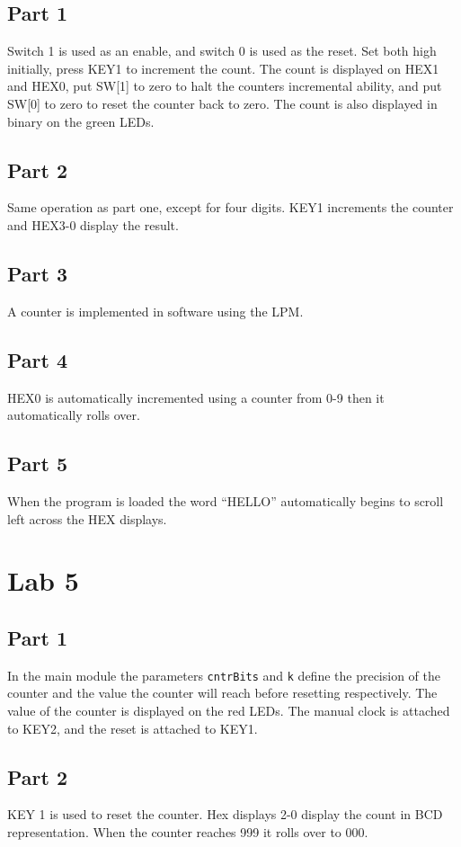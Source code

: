 \documentclass[oneside,letterpaper,12pt,titlepage]{article}
\begin{document}
\subsection{Part 1}
Switch 1 is used as an enable, and switch 0 is used as the reset. Set both high initially, press KEY1 to increment the count. The count is displayed on HEX1 and HEX0, put SW[1] to zero to halt the counters incremental ability, and put SW[0] to zero to reset the counter back to zero. The count is also displayed in binary on the green LEDs.

\subsection{Part 2}
Same operation as part one, except for four digits. KEY1 increments the counter and HEX3-0 display the result. 

\subsection{Part 3}
A counter is implemented in software using the LPM.

\subsection{Part 4}
HEX0 is automatically incremented using a counter from 0-9 then it automatically rolls over.

\subsection{Part 5}
When the program is loaded the word ``HELLO'' automatically begins to scroll left across the HEX displays.

\section{Lab 5}

\subsection{Part 1}
In the main module the parameters \texttt{cntrBits} and \texttt{k} define the precision of the counter and the value the counter will reach before resetting respectively. The value of the counter is displayed on the red LEDs. The manual clock is attached to KEY2, and the reset is attached to KEY1.

\subsection{Part 2}
KEY 1 is used to reset the counter. Hex displays 2-0 display the count in BCD representation. When the counter reaches 999 it rolls over to 000.
\end{document}
